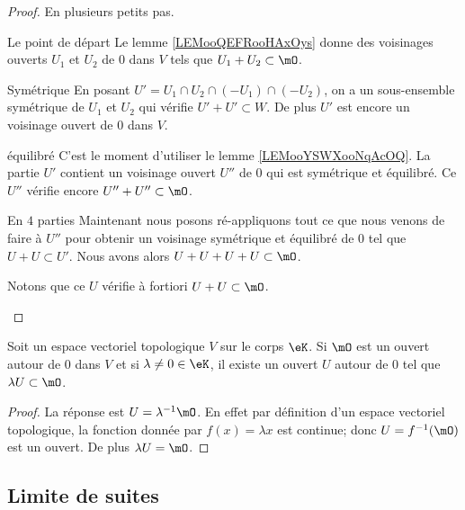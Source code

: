 \begin{proof}
    En plusieurs petits pas.
    \begin{subproof}
        \item[Le point de départ] 
            Le lemme \ref{LEMooQEFRooHAxOys} donne des voisinages ouverts \( U_1\) et \( U_2\) de \( 0\) dans \( V\) tels que \( U_1+U_2\subset \mO\).
        \item[Symétrique]
            En posant \( U' = U_1 \cap U_2 \cap (-U_1) \cap (-U_2) \), on a un sous-ensemble symétrique de \( U_1\) et \(U_2\) qui vérifie \( U' + U'\subset W \). De plus \( U'\) est encore un voisinage ouvert de \( 0\) dans \( V\).
        \item[équilibré]
            C'est le moment d'utiliser le lemme \ref{LEMooYSWXooNqAcOQ}. La partie \( U'\) contient un voisinage ouvert \( U''\) de \( 0\) qui est symétrique et équilibré. Ce \( U''\) vérifie encore \( U''+U''\subset \mO\).
        \item[En \( 4\) parties]
            Maintenant nous posons ré-appliquons tout ce que nous venons de faire à \( U''\) pour obtenir un voisinage symétrique et équilibré de \( 0\) tel que \( U+U\subset U'\). Nous avons alors \( U+U+U+U\subset \mO\).

            Notons que ce \( U\) vérifie à fortiori \( U+U\subset \mO\).
    \end{subproof}
\end{proof}


\begin{lemma}            \label{LEMooEZIYooBBxdJj}
    Soit un espace vectoriel topologique \( V\) sur le corps \( \eK\). Si \( \mO\) est un ouvert autour de \( 0\) dans \( V\) et si \( \lambda\neq 0\in \eK\), il existe un ouvert \( U\) autour de \( 0\) tel que \( \lambda U\subset \mO\).
\end{lemma}

\begin{proof}
    La réponse est \( U=\lambda^{-1}\mO\). En effet par définition d'un espace vectoriel topologique, la fonction donnée par \( f(x)=\lambda x  \) est continue; donc \( U=f^{-1}(\mO)\) est un ouvert. De plus \( \lambda U=\mO\).
\end{proof}


\subsection{Limite de suites}

